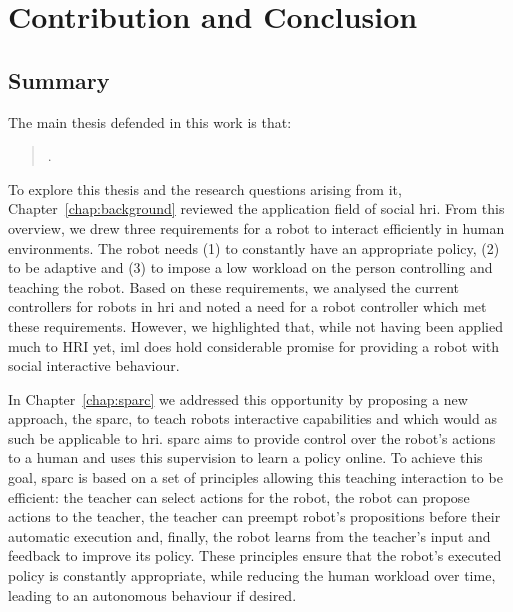\chapter{Contribution and Conclusion} \label{chap:conclusion}
\glsresetall

\section{Summary}\label{sec:conc_summary}

The main thesis defended in this work is that: 
\begin{quote}
	\thesis. 
\end{quote}

To explore this thesis and the research questions arising from it, Chapter~\ref{chap:background}  reviewed the application field of social \gls{hri}. From this overview, we drew three requirements for a robot to interact efficiently in human environments. The robot needs (1) to constantly have an appropriate policy, (2) to be adaptive and (3) to impose a low workload on the person controlling and teaching the robot. Based on these requirements, we analysed the current controllers for robots in \gls{hri} and noted a need for a robot controller which met these requirements. However, we highlighted that, while not having been applied much to HRI yet, \gls{iml} does hold considerable promise for providing a robot with social interactive behaviour.

In Chapter~\ref{chap:sparc} we addressed this opportunity by proposing a new approach, the \gls{sparc}, to teach robots interactive capabilities and which would as such be applicable to \gls{hri}. \gls{sparc} aims to provide control over the robot's actions to a human and uses this supervision to learn a policy online. To achieve this goal, \gls{sparc} is based on a set of principles allowing this teaching interaction to be efficient: the teacher can select actions for the robot, the robot can propose actions to the teacher, the teacher can preempt robot's propositions before their automatic execution and, finally, the robot learns from the teacher's input and feedback to improve its policy. These principles ensure that the robot's executed policy is constantly appropriate, while reducing the human workload over time, leading to an autonomous behaviour if desired.

